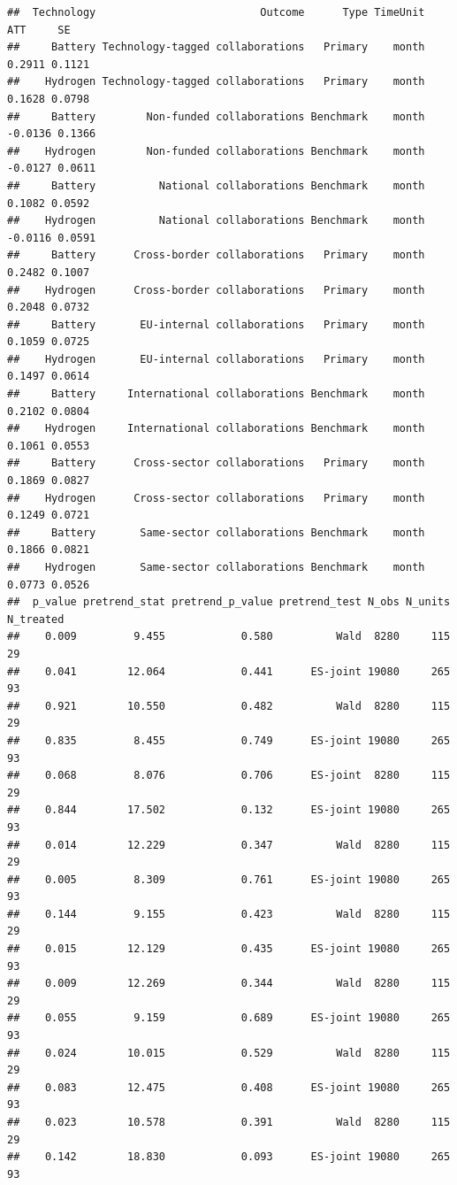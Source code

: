 \documentclass[
]{article}
\begin{document}
\begin{verbatim}
##  Technology                          Outcome      Type TimeUnit     ATT     SE
##     Battery Technology-tagged collaborations   Primary    month  0.2911 0.1121
##    Hydrogen Technology-tagged collaborations   Primary    month  0.1628 0.0798
##     Battery        Non-funded collaborations Benchmark    month -0.0136 0.1366
##    Hydrogen        Non-funded collaborations Benchmark    month -0.0127 0.0611
##     Battery          National collaborations Benchmark    month  0.1082 0.0592
##    Hydrogen          National collaborations Benchmark    month -0.0116 0.0591
##     Battery      Cross-border collaborations   Primary    month  0.2482 0.1007
##    Hydrogen      Cross-border collaborations   Primary    month  0.2048 0.0732
##     Battery       EU-internal collaborations   Primary    month  0.1059 0.0725
##    Hydrogen       EU-internal collaborations   Primary    month  0.1497 0.0614
##     Battery     International collaborations Benchmark    month  0.2102 0.0804
##    Hydrogen     International collaborations Benchmark    month  0.1061 0.0553
##     Battery      Cross-sector collaborations   Primary    month  0.1869 0.0827
##    Hydrogen      Cross-sector collaborations   Primary    month  0.1249 0.0721
##     Battery       Same-sector collaborations Benchmark    month  0.1866 0.0821
##    Hydrogen       Same-sector collaborations Benchmark    month  0.0773 0.0526
##  p_value pretrend_stat pretrend_p_value pretrend_test N_obs N_units N_treated
##    0.009         9.455            0.580          Wald  8280     115        29
##    0.041        12.064            0.441      ES-joint 19080     265        93
##    0.921        10.550            0.482          Wald  8280     115        29
##    0.835         8.455            0.749      ES-joint 19080     265        93
##    0.068         8.076            0.706      ES-joint  8280     115        29
##    0.844        17.502            0.132      ES-joint 19080     265        93
##    0.014        12.229            0.347          Wald  8280     115        29
##    0.005         8.309            0.761      ES-joint 19080     265        93
##    0.144         9.155            0.423          Wald  8280     115        29
##    0.015        12.129            0.435      ES-joint 19080     265        93
##    0.009        12.269            0.344          Wald  8280     115        29
##    0.055         9.159            0.689      ES-joint 19080     265        93
##    0.024        10.015            0.529          Wald  8280     115        29
##    0.083        12.475            0.408      ES-joint 19080     265        93
##    0.023        10.578            0.391          Wald  8280     115        29
##    0.142        18.830            0.093      ES-joint 19080     265        93
\end{verbatim}
\end{document}
